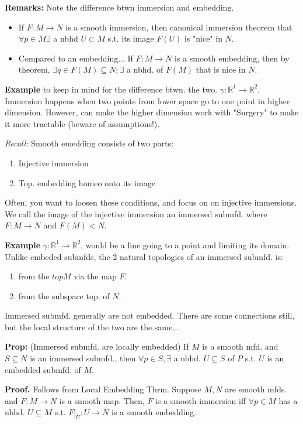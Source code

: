 \documentclass[12pt,letterpaper]{article}
\begin{document}
\textbf{Remarks:} Note the difference btwn immersion and embedding. 
\begin{itemize}
    \item If $F: M \rightarrow N$ is a smooth immersion, then canonical immersion theorem that $\forall p \in M \exists$ a nbhd $U \subset M$ s.t. its image $F(U)$ is "nice" in $N$. 
    \item Compared to an embedding... If $F: M \rightarrow N$ is a smooth embedding, then by theorem, $\exists q \in F(M) \subseteq N; \exists $ a nbhd. of $F(M)$ that is nice in $N$. 
\end{itemize}

\textbf{Example} to keep in mind for the difference btwn. the two. $\gamma : \mathbb{R}^1 \rightarrow \mathbb{R}^2$. Immersion happens when two points from lower space go to one point in higher dimension. However, can make the higher dimension work with "Surgery" to make it more tractable (beware of assumptions!). 

\textit{Recall:} Smooth emedding consists of two parts:
\begin{enumerate}
    \item Injective immersion
    \item Top. embedding homeo onto its image
\end{enumerate}

Often, you want to loosen these conditions, and focus on on injective immersions. We call the image of the injective immersion an immersed submfd. where $F: M \rightarrow N$ and $F(M) < N$. 

\textbf{Example} $\gamma: \mathbb{R}^1 \rightarrow \mathbb{R}^2$, would be a line going to a point and limiting its domain. Unlike embeded submfds, the 2 natural topologies of an immersed submfd. is:
\begin{enumerate}
    \item from the $topM$ via the map $F$. 
    \item from the subspace top. of $N$. 
\end{enumerate}

Immersed submfd. generally are not embedded. There are some connections still, but the local structure of the two are the same...

\textbf{Prop:} (Immersed submfd. are locally embedded) If $M$ is a smooth mfd. and $S \subseteq N$ is an immersed submfd., then $\forall p \in S, \exists $ a nbhd. $U \subseteq S$ of $P$ s.t. $U$ is an embedded submfd. of $M$. 

\textbf{Proof.} Follows from 
Local Embedding Thrm. Suppose $M,N$ are smooth mfds. and $F: M\rightarrow N$ is a smooth map. Then, $F$ is a smooth immersion iff $\forall p \in M$ has a nbhd. $U \subseteq M$ s.t. $F|_U : U \rightarrow N$ is a smooth embedding. 
\end{document}
